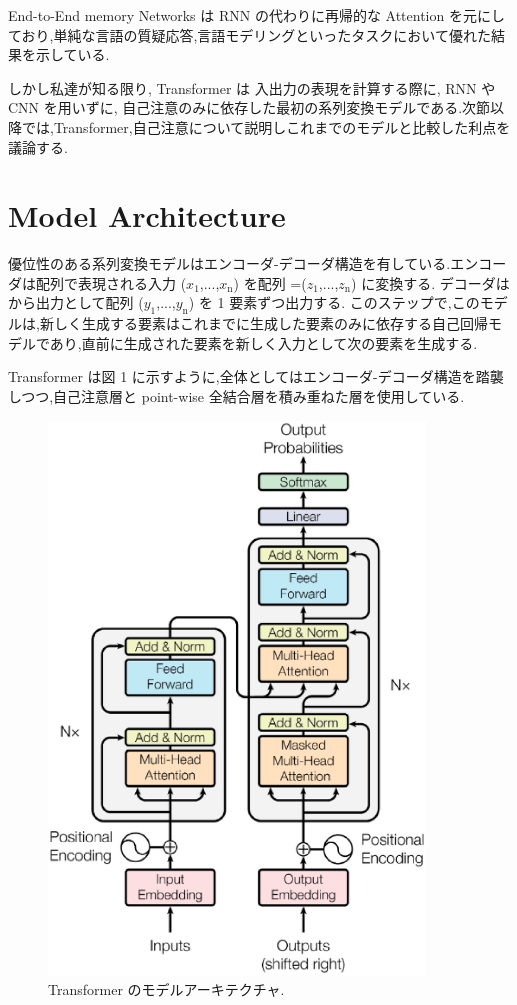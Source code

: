 \documentclass{jarticle}     %
\begin{document}
End-to-End memory Networks は RNN の代わりに再帰的な Attention を元にしており,単純な言語の質疑応答,言語モデリングといったタスクにおいて優れた結果を示している.\par

しかし私達が知る限り, Transformer は 入出力の表現を計算する際に, RNN や CNN を用いずに, 自己注意のみに依存した最初の系列変換モデルである.次節以降では,Transformer,自己注意について説明しこれまでのモデルと比較した利点を議論する.




\section{Model Architecture}
優位性のある系列変換モデルはエンコーダ-デコーダ構造を有している.エンコーダは配列で表現される入力 ($x_\mathrm{1}$,...,$x_\mathrm{n}$) を配列 =($z_\mathrm{1}$,...,$z_\mathrm{n}$) に変換する.
デコーダは  から出力として配列 ($y_\mathrm{1}$,...,$y_\mathrm{n}$) を 1 要素ずつ出力する.
このステップで,このモデルは,新しく生成する要素はこれまでに生成した要素のみに依存する自己回帰モデル\cite{自己回帰モデル}であり,直前に生成された要素を新しく入力として次の要素を生成する.\par
Transformer は図 1 に示すように,全体としてはエンコーダ-デコーダ構造を踏襲しつつ,自己注意層と point-wise 全結合層を積み重ねた層を使用している.

\begin{figure}[ht]
  \centering
  \includegraphics[width=100mm]{assets/Figure1.eps}
  \caption{ Transformer のモデルアーキテクチャ.}
  \label{Figure1}
\end{figure}
\end{document}
